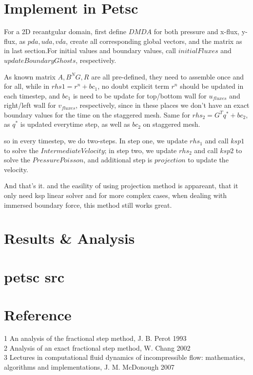 \documentclass[11pt]{article}
\begin{document}
\section{Implement in Petsc}

For a 2D recantgular domain, first define $DMDA$ for both pressure and x-flux, y-flux, as $pda, uda, vda$, create all corresponding global vectors, and the matrix as in last section.For initial values and boundary values, call $initialFluxes$ and $updateBoundaryGhosts$, respectively.

As known matrix $A, B^NG, R$ are all pre-defined, they need to assemble once and for all, while in $rhs1 = r^n + bc_1$, no doubt explicit term $r^n$ should be updated in each timestep, and $bc_1$ is need to be update for top/bottom wall for $u_{fluxes}$ and right/left wall for $v_{fluxes}$, respectively, since in these places we don't have an exact boundary values for the time on the staggered mesh. Same for $rhs_2 = G^T q^* + bc_2$, as $q^*$ is updated everytime step, as well as $bc_2$ on staggered mesh.

so in every timestep, we do two-steps. In step one, we update $rhs_1$ and call $ksp1$ to solve the $IntermediateVelocity$; in step two, we update $rhs_2$ and call $ksp2$ to solve the $PressurePoisson$, and additional step is $projection$ to update the velocity.

And that's it. and the easility of using projection method is appareant, that it only need ksp linear solver and for more complex cases, when dealing with immersed boundary force, this method still works great.

\section{Results \& Analysis}


\section{petsc src}

\section {Reference}
1 An analysis of the fractional step method, J. B. Perot 1993
\\ 2 Analysis of an exact fractional step method, W. Chang 2002
\\ 3 Lectures in computational fluid dynamics of incompressible flow: mathematics, algorithms and implementations, J. M. McDonough 2007
\end{document}
